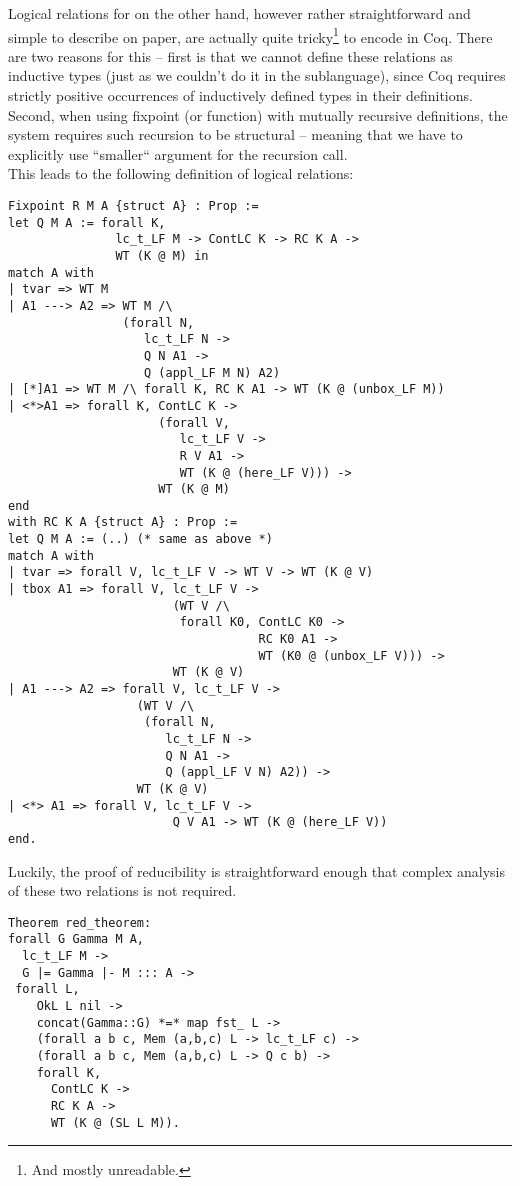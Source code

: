 Logical relations for \langLF{} on the other hand, however rather straightforward and simple to describe on paper, are actually quite tricky\footnote{And mostly unreadable.}  to encode in Coq. There are two reasons for this -- first is that we cannot define these relations as inductive types (just as we couldn't do it in the sublanguage), since Coq requires strictly positive occurrences of inductively defined types in their definitions. Second, when using fixpoint (or function) with mutually recursive definitions, the system requires such recursion to be structural -- meaning that we have to explicitly use ``smaller`` argument for the recursion call.\\
\newpage
This leads to the following definition of logical relations:
\begin{verbatim}
Fixpoint R M A {struct A} : Prop :=
let Q M A := forall K,
               lc_t_LF M -> ContLC K -> RC K A ->
               WT (K @ M) in
match A with
| tvar => WT M
| A1 ---> A2 => WT M /\
                (forall N,
                   lc_t_LF N ->
                   Q N A1 ->
                   Q (appl_LF M N) A2)
| [*]A1 => WT M /\ forall K, RC K A1 -> WT (K @ (unbox_LF M))
| <*>A1 => forall K, ContLC K ->
                     (forall V,
                        lc_t_LF V ->
                        R V A1 ->
                        WT (K @ (here_LF V))) ->
                     WT (K @ M)
end
with RC K A {struct A} : Prop :=
let Q M A := (..) (* same as above *)
match A with
| tvar => forall V, lc_t_LF V -> WT V -> WT (K @ V)
| tbox A1 => forall V, lc_t_LF V ->
                       (WT V /\
                        forall K0, ContLC K0 ->
                                   RC K0 A1 ->
                                   WT (K0 @ (unbox_LF V))) ->
                       WT (K @ V)
| A1 ---> A2 => forall V, lc_t_LF V ->
                  (WT V /\
                   (forall N,
                      lc_t_LF N ->
                      Q N A1 ->
                      Q (appl_LF V N) A2)) ->
                  WT (K @ V)
| <*> A1 => forall V, lc_t_LF V ->
                       Q V A1 -> WT (K @ (here_LF V))
end.
\end{verbatim}

Luckily, the proof of reducibility is straightforward enough that complex analysis of these two relations is not required.
\begin{verbatim}
Theorem red_theorem:
forall G Gamma M A,
  lc_t_LF M ->
  G |= Gamma |- M ::: A ->
 forall L,
    OkL L nil ->
    concat(Gamma::G) *=* map fst_ L ->
    (forall a b c, Mem (a,b,c) L -> lc_t_LF c) ->
    (forall a b c, Mem (a,b,c) L -> Q c b) ->
    forall K,
      ContLC K ->
      RC K A ->
      WT (K @ (SL L M)).
\end{verbatim}

